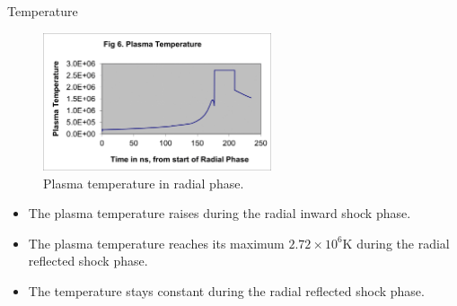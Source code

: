 \begin{frame} {Temperature}
    \begin{figure}
        \centering
        \includegraphics[width=0.6\textwidth]{figures/figure6.png}
        \caption{Plasma temperature in radial phase.}
        \label{fig:temperature}
    \end{figure}
    \begin{itemize}
        \item The plasma temperature raises during the radial inward shock phase.
        \item The plasma temperature reaches its maximum $2.72\times 10^6$K during the radial reflected shock phase.
        \item The temperature stays constant during the radial reflected shock phase.
    \end{itemize}
\end{frame}

